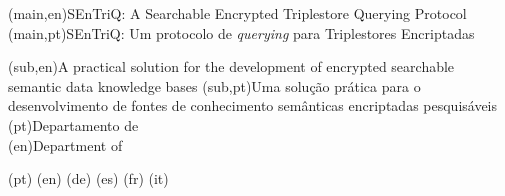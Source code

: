 

%


\nttitle(main,en){SEnTriQ: A Searchable Encrypted Triplestore Querying Protocol}%
\nttitle(main,pt){SEnTriQ: Um protocolo de \textit{querying} para Triplestores Encriptadas}%

\nttitle(sub,en){A practical solution for the development of encrypted searchable semantic data knowledge bases}%
\nttitle(sub,pt){Uma solução prática para o desenvolvimento de fontes de conhecimento semânticas encriptadas pesquisáveis}
\ntdepartment(pt){Departamento de\\}
\ntdepartment(en){Department of\\}

\ntdegreename(pt){}
\ntdegreename(en){}
\ntdegreename(de){}
\ntdegreename(es){}
\ntdegreename(fr){}
\ntdegreename(it){}

